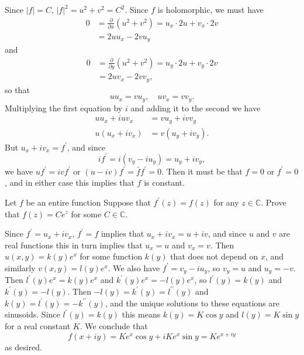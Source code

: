 \documentclass{article}
\newcounter{Problem}
\newenvironment{Problem}{\begin{Exercise}[name={Problem},
                                          counter={Problem}]}
                        {\end{Exercise}}
\begin{document}
\begin{Answer}
  Since $|f| = C$, $|f|^2 = u^2 + v^2 = C^2$. Since $f$ is
  holomorphic, we must have
  \begin{align*}
    0 &= \frac{\partial}{\partial x} (u^2 + v^2)
       = u_x \cdot 2 u + v_x \cdot 2 v \\
      &= 2 u u_x - 2 v u_y
  \end{align*}
  and
  \begin{align*}
    0 &= \frac{\partial}{\partial y} (u^2 + v^2)
       = u_y \cdot 2 u + v_y \cdot 2 v \\
      &= 2 u v_x - 2 v v_y,
  \end{align*}
  so that
  $$
  u u_x = v u_y, \quad
  u v_x = v v_y.
  $$
  Multiplying the first equation by $i$ and adding it to the second we
  have
  \begin{align*}
  u u_x + i u v_x &= v u_y + i v v_y \\
  u (u_x + i v_x) &= v (u_y + i v_y).
  \end{align*}
  But $u_x + i v_x = f^\prime$, and since
  $$
  i f^\prime = i(v_y - i u_y) = u_y + i v_y,
  $$
  we have $u f^\prime = i v f^\prime$ or
  $(u - iv)f^\prime = \bar{f} f^\prime = 0$. Then it must be that
  $f = 0$ or $f^\prime = 0$, and in either case this implies that $f$
  is constant.
\end{Answer}

\begin{Problem}
  Let $f$ be an entire function Suppose that $f^\prime(z) = f(z)$ for
  any $z \in \mathbb{C}$. Prove that $f(z) = C e^z$ for some
  $C \in \mathbb{C}$.
\end{Problem}

\begin{Answer}
Since $f^\prime = u_x + i v_x$, $f^\prime = f$ implies
that $u_x + i v_x = u + i v$, and since $u$ and $v$ are
real functions this in turn implies that $u_x = u$ and
$v_x = v$. Then $u(x, y) = k(y) e^x$ for some function
$k(y)$ that does not depend on $x$, and similarly
$v(x, y) = l(y) e^x$.
We also have $f^\prime = v_y - i u_y$, so
$v_y = u$ and $u_y = -v$. Then
$l^\prime(y) e^x = k(y) e^x$ and
$k^\prime(y) e^x = -l(y) e^x$, so
$l^\prime(y) = k(y)$ and
$k^\prime(y) = -l(y)$. Then
$-l(y) = k^\prime(y) = l^{\prime\prime}(y)$
and $k(y) = l^\prime(y) = -k^{\prime\prime}(y)$, and the unique
solutions to these equations are sinusoids.
Since $l^\prime(y) = k(y)$ this means
$k(y) = K \cos y$ and $l(y) = K \sin y$
for a real constant $K$. We conclude that
$$
  f(x + iy)
= K e^x \cos y + i K e^x \sin y
= K e^{x + iy}
$$
as desired.
\end{Answer}
\end{document}
